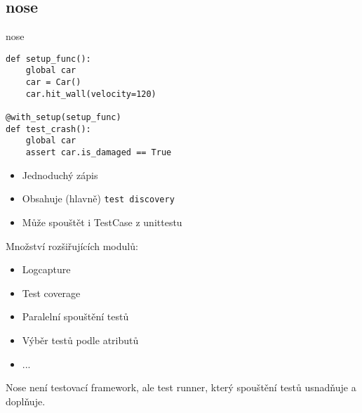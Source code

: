 \subsection{nose}

\begin{frame}
\begin{center}
\huge{nose}
\end{center}
\end{frame}

\begin{frame}[fragile]
\begin{verbatim}
def setup_func():
    global car
    car = Car()
    car.hit_wall(velocity=120)

@with_setup(setup_func)
def test_crash():
    global car
    assert car.is_damaged == True

\end{verbatim}
\end{frame}

\begin{frame}
\begin{itemize}[<+->]
\item Jednoduchý zápis
\item Obsahuje (hlavně) {\tt test discovery}
\item Může spouštět i TestCase z unittestu
\end{itemize}
\end{frame}

\begin{frame}
Množství rozšiřujících modulů:
\begin{itemize}[<+->]
\item Logcapture
\item Test coverage
\item Paralelní spouštění testů
\item Výběr testů podle atributů
\item ...
\end{itemize}
\end{frame}

\begin{frame}
\begin{alertblock}{}
      Nose není testovací framework, ale test runner, který spouštění testů usnadňuje a doplňuje.
   \end{alertblock}
\end{frame}
